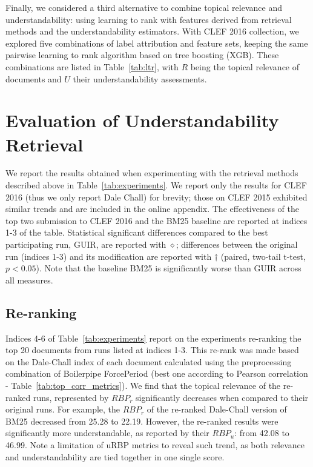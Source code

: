 Finally, we considered a third alternative to combine topical relevance and understandability: using learning to rank with features derived from retrieval methods and the understandability estimators.
With CLEF 2016 collection, we explored five combinations of label attribution and feature sets, keeping the same pairwise learning to rank algorithm based on tree boosting (XGB).
These combinations are listed in Table~\ref{tab:ltr}, with $R$ being the topical relevance of documents and $U$ their understandability assessments. 





\vspace{-10pt}
\section{Evaluation of Understandability Retrieval}
\label{sec:results}

We report the results obtained when experimenting with the retrieval methods described above in Table~\ref{tab:experiments}. We report only the results for CLEF 2016 (thus we only report Dale Chall) for brevity; those on CLEF 2015 exhibited similar trends and are included in the online appendix. The effectiveness of the top two submission to CLEF 2016 and the BM25 baseline are reported at indices 1-3 of the table. Statistical significant differences compared to the best participating run, GUIR, are reported with $\diamond$; differences between the original run (indices 1-3) and its modification are reported with $\dagger$ (paired, two-tail t-test, $p<0.05$). Note that the baseline BM25 is significantly worse than GUIR across all measures. 


\subsection{Re-ranking}
\label{results:reranking}

Indices 4-6 of Table~\ref{tab:experiments} report on the experiments re-ranking the top 20 documents from runs listed at indices 1-3. This re-rank was made based on the Dale-Chall index of each document calculated using the preprocessing combination of Boilerpipe ForcePeriod (best one according to Pearson correlation - Table~\ref{tab:top_corr_metrics}).
We find that the topical relevance of the re-ranked runs, represented by $RBP_r$ significantly decreases when compared to their original runs. For example, the $RBP_r$ of the re-ranked Dale-Chall version of BM25 decreased from 25.28 to 22.19. However, the re-ranked results were significantly more understandable, as reported by their $RBP_u$: from 42.08 to 46.99. 
Note a limitation of uRBP metrics to reveal such trend, as both relevance and understandability are tied together in one single score.

